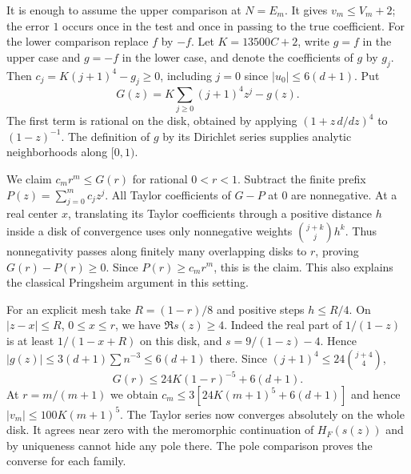 It is enough to assume the upper comparison at $N=E_m$. It gives
$v_m\le V_m+2$; the error $1$ occurs once in the test and once in passing
to the true coefficient. For the lower comparison replace $f$ by $-f$.
Let $K=13500C+2$, write $g=f$ in the upper case and $g=-f$ in the
lower case, and denote the coefficients of $g$ by $g_j$. Then
$c_j=K(j+1)^4-g_j\ge0$, including $j=0$ since $|u_0|\le6(d+1)$.
Put
\[
 G(z)=K\sum_{j\ge0}(j+1)^4z^j-g(z).
\]
The first term is rational on the disk, obtained by applying
$(1+z\,d/dz)^4$ to $(1-z)^{-1}$. The definition of $g$ by its
Dirichlet series supplies analytic neighborhoods along $[0,1)$.

We claim $c_m r^m\le G(r)$ for rational $0<r<1$. Subtract the finite
prefix $P(z)=\sum_{j=0}^m c_j z^j$. All Taylor coefficients of $G-P$
at $0$ are nonnegative. At a real center $x$, translating its Taylor
coefficients through a positive distance $h$ inside a disk of convergence
uses only nonnegative weights $\binom{j+k}{j}h^k$. Thus nonnegativity
passes along finitely many overlapping disks to $r$, proving
$G(r)-P(r)\ge0$. Since $P(r)\ge c_m r^m$, this is the claim.
This also explains the classical Pringsheim argument in this setting.

For an explicit mesh take $R=(1-r)/8$ and positive steps $h\le R/4$.
On $|z-x|\le R$, $0\le x\le r$, we have $\Re s(z)\ge4$. Indeed
the real part of $1/(1-z)$ is at least $1/(1-x+R)$ on this disk, and
$s=9/(1-z)-4$. Hence $|g(z)|\le3(d+1)\sum n^{-3}\le6(d+1)$
there. Since $(j+1)^4\le24\binom{j+4}{4}$,
\[
  G(r)\le 24K(1-r)^{-5}+6(d+1).
\]
At $r=m/(m+1)$ we obtain $c_m\le 3[24K(m+1)^5+6(d+1)]$ and hence
$|v_m|\le100K(m+1)^5$. The Taylor series now converges absolutely on
the whole disk. It agrees near zero with the meromorphic continuation
of $H_F(s(z))$ and by uniqueness cannot hide any pole there. The pole
comparison proves the converse for each family.

